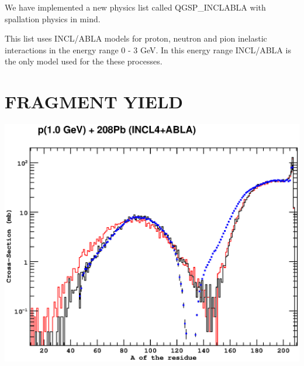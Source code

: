 \documentclass[20pt]{article}
\newenvironment{textbox}
{\begin{lrbox}{\dummybox}\begin{minipage}{0.9\columnwidth}}
{\end{minipage}\end{lrbox}\raisebox{-\depth}{\psshadowbox[framesep=1em,framearc=.1,shadow=true]{\usebox{\dummybox}}}\vspace{0.005\textheight}}
\begin{document}
\begin{center}
\begin{multicols}{3}
\begin{textbox}
{\color{udsect}

We have implemented a new physics list called {\sf QGSP\_\-INCL\-ABLA} with
spallation physics in mind. 
}

\vspace{1cm}
This list uses {\sf INCL/ABLA} models for proton,
neutron and pion inelastic interactions in the energy range 0 - 3
GeV.
\vskip1cm
In this energy range {\sf INCL/ABLA} is the only model used for the
these processes.

\end{textbox}

\vspace{2cm}
\section*{{\Huge {\sf FRAGMENT YIELD}}}
\vspace{-1cm}
\begin{center}

\includegraphics[scale=0.70]{images/fragments.eps}


\end{center}
\end{multicols}
\end{center}
\end{document}
